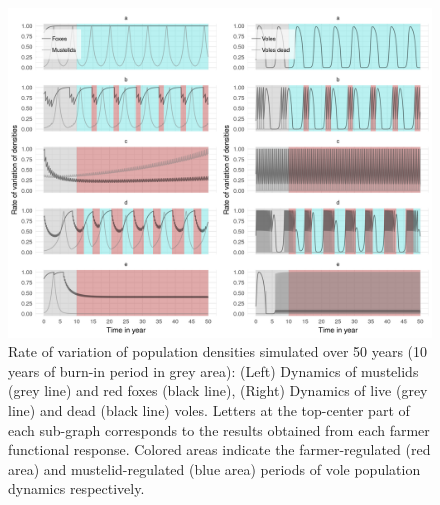 \documentclass[11pt]{article}
\begin{document}
\begin{figure}
	\begin{center}
		\includegraphics[width=\linewidth]{img/plot_join.png}
		\caption{Rate of variation of population densities simulated over 50 years (10 years of burn-in period in grey area): (Left) Dynamics of mustelids (grey line) and red foxes (black line), (Right) Dynamics of live (grey line) and dead (black line) voles. Letters at the top-center part of each sub-graph corresponds to the results obtained from each farmer functional response. Colored areas indicate the farmer-regulated (red area) and mustelid-regulated (blue area) periods of vole population dynamics respectively.}
		\label{fig:populations}
	\end{center}
\end{figure}

\end{document}

